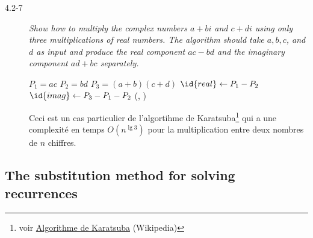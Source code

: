 \begin{description}
  \item[4.2-7] {\itshape Show how to multiply the complex numbers $a + bi$ and $c + di$ using only three multiplications of real numbers. The algorithm should take $a, b, c$, and $d$ as input and produce the real component $ac-bd$ and the imaginary component $ad + bc$ separately.}
    \begin{ex}
      \begin{codebox}%
        \li $P_1 = ac$
        \li $P_2 = bd$
        \li $P_3 = (a+b)(c+d)$
        \li $\id{real} \gets P_1 - P_2$
        \li $\id{imag} \gets P_3-P_1-P_2$
        \li \Return (, )
      \end{codebox}

      Ceci est un cas particulier de l'algortihme de Karatsuba\footnote{voir \href{https://en.wikipedia.org/wiki/Karatsuba_algorithm}{Algorithme de Karatsuba} (Wikipedia)} qui a une complexit\'e en temps $O(n^{\lg 3})$ pour la multiplication entre deux nombres de $n$ chiffres.

    \end{ex}

\end{description}

\subsection{The substitution method for solving recurrences}

